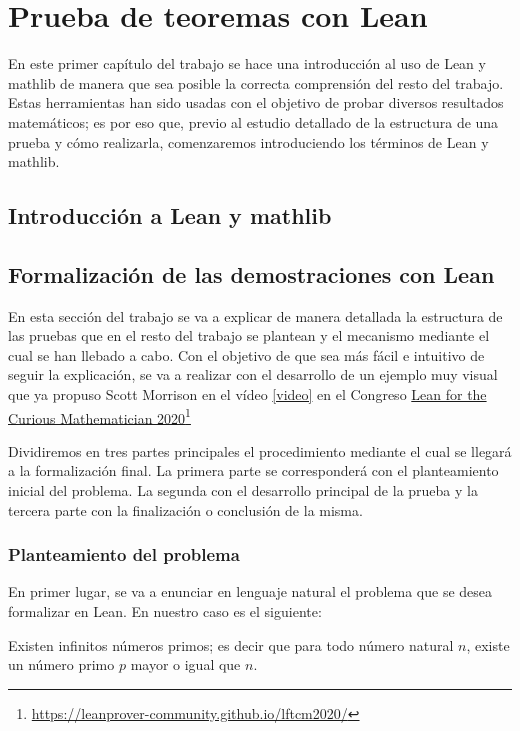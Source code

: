 \chapter{Prueba de teoremas con Lean}

En este primer capítulo del trabajo se hace una introducción al uso de
Lean y mathlib de manera que sea posible la correcta comprensión del
resto del trabajo. Estas herramientas han sido usadas con el objetivo de
probar diversos resultados matemáticos; es por eso que, previo al
estudio detallado de la estructura de una prueba y cómo realizarla,
comenzaremos introduciendo los términos de Lean y mathlib.

\section{Introducción a Lean y mathlib}

\section{Formalización de las demostraciones con Lean}

En esta sección del trabajo se va a explicar de manera detallada la
estructura de las pruebas que en el resto del trabajo se plantean y el
mecanismo mediante el cual se han llebado a cabo. Con el objetivo de que
sea más fácil e intuitivo de seguir la explicación, se va a realizar con
el desarrollo de un ejemplo muy visual que ya propuso Scott Morrison en
el vídeo \ref{video} en el Congreso
\href{https://leanprover-community.github.io/lftcm2020/}
     {Lean for the Curious Mathematician 2020}\footnote{\url{https://leanprover-community.github.io/lftcm2020/}}

Dividiremos en tres partes principales el procedimiento mediante el
cual se llegará a la formalización final. La primera parte se
corresponderá con el planteamiento inicial del problema. La segunda
con el desarrollo principal de la prueba y la tercera parte con la
finalización o conclusión de la misma.

\subsection{Planteamiento del problema}

En primer lugar, se va a enunciar en lenguaje natural el problema que se
desea formalizar en Lean. En nuestro caso es el siguiente:

\begin{teorema}\label{infi}
  Existen infinitos números primos; es decir que para todo número
  natural \(n\), existe un número primo \(p\) mayor o igual que
  \(n\).
\end{teorema}

